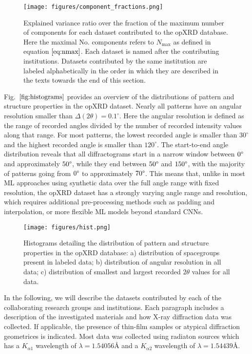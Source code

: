 \begin{figure}[!htb]
    \centering
    \texttt{[image: figures/component\_fractions.png]}
    \caption{Explained variance ratio over the fraction of the maximum number of components for each dataset contributed to the opXRD database. Here the maximal No. components refers to $N_{\text{max}}$ as defined in equation $\eqref{eq:nmax}$. Each dataset is named after the contributing institutions. Datasets contributed by the same institution are labeled alphabetically in the order in which they are described in the texts towards the end of this section.}
    \label{fig:components}
\end{figure}

Fig.~$\eqref{fig:histograms}$ provides an overview of the distributions of pattern and structure properties in the opXRD dataset. Nearly all patterns have an angular resolution smaller than $\Delta(2\theta) = 0.1 ^\circ$. Here the angular resolution is defined as the range of recorded angles divided by the number of recorded intensity values along that range. For most patterns, the lowest recorded angle is smaller than $30 ^\circ$ and the highest recorded angle is smaller than $120 ^\circ$. The start-to-end angle distribution reveals that all diffractograms start in a narrow window between $0\degree$ and approximately $50\degree$, while they end between $50\degree$ and $150\degree$, with the majority of patterns going from $0\degree$ to approximately $70\degree$. This means that, unlike in most ML approaches using synthetic data over the full angle range with fixed resolution, the opXRD dataset has a strongly varying angle range and resolution, which requires additional pre-processing methods such as padding and interpolation, or more flexible ML models beyond standard CNNs.

\begin{figure}[!htb]
    \centering
    \texttt{[image: figures/hist.png]}
    \caption{Histograms detailing the distribution of pattern and structure properties in the opXRD database: a) distribution of spacegroups present in labeled data; b) distribution of angular resolution in all data; c) distribution of smallest and largest recorded $2\theta$ values for all data.}
    \label{fig:histograms}
\end{figure}

In the following, we will describe the datasets contributed by each of the collaborating research groups and institutions. Each paragraph includes a description of the investigated materials and how X-ray diffraction data was collected. If applicable, the presence of thin-film samples or atypical diffraction geometrices is indicated. Most data was collected using  radiaton sources which has a $K_{\alpha1}$ wavelength of $\lambda=1.54056\text{\AA}$ and a $K_{\alpha2}$ wavelength of $\lambda=1.54439\text{\AA}$.

